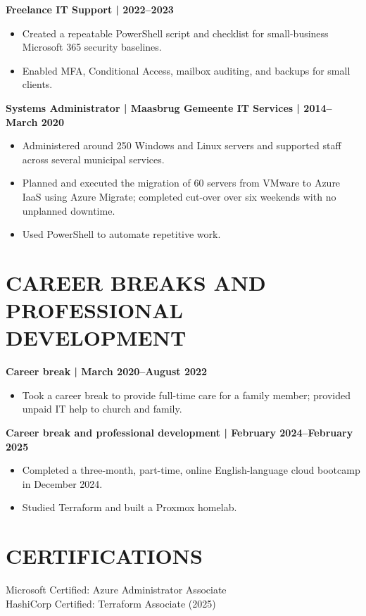 \documentclass[11pt,a4paper]{article}
\begin{document}
\textbf{Freelance IT Support | 2022--2023}
\begin{itemize}
\item Created a repeatable PowerShell script and checklist for small-business Microsoft 365 security baselines.
\item Enabled MFA, Conditional Access, mailbox auditing, and backups for small clients.
\end{itemize}

\textbf{Systems Administrator | Maasbrug Gemeente IT Services | 2014--March 2020}
\begin{itemize}
\item Administered around 250 Windows and Linux servers and supported staff across several municipal services.
\item Planned and executed the migration of 60 servers from VMware to Azure IaaS using Azure Migrate; completed cut-over over six weekends with no unplanned downtime.
\item Used PowerShell to automate repetitive work.
\end{itemize}

\section*{CAREER BREAKS AND PROFESSIONAL DEVELOPMENT}
\textbf{Career break | March 2020--August 2022}
\begin{itemize}
\item Took a career break to provide full-time care for a family member; provided unpaid IT help to church and family.
\end{itemize}

\textbf{Career break and professional development | February 2024--February 2025}
\begin{itemize}
\item Completed a three-month, part-time, online English-language cloud bootcamp in December 2024.
\item Studied Terraform and built a Proxmox homelab.
\end{itemize}

\section*{CERTIFICATIONS}
Microsoft Certified: Azure Administrator Associate\\
HashiCorp Certified: Terraform Associate (2025)
\end{document}
